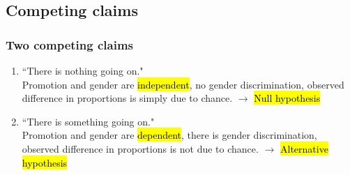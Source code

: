 \documentclass[slidestop,compress,mathserif]{beamer}
\begin{document}

\subsection{Competing claims}


\begin{frame}
\frametitle{Two competing claims}

\begin{enumerate}

\item ``There is nothing going on." \\
Promotion and gender are \hl{independent}, no gender discrimination, observed difference in proportions is simply due to chance. $\rightarrow$ \hl{Null hypothesis}

\pause

\item ``There is something going on." \\
Promotion and gender are \hl{dependent}, there is gender discrimination, observed difference in proportions is not due to chance. $\rightarrow$ \hl{Alternative hypothesis}

\end{enumerate}

\end{frame}

\end{document}
